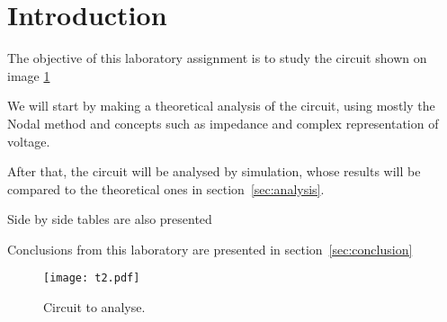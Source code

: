 \section{Introduction}

The objective of this laboratory assignment is to study the circuit shown on image \ref{Fig1: circuit}

We will start by making a theoretical analysis of the circuit, using mostly the Nodal method and concepts such as impedance and complex representation of voltage.

After that, the circuit will be analysed by simulation, whose results will be compared to the theoretical ones in section~\ref{sec:analysis}.

Side by side tables are also presented

Conclusions from this laboratory are presented in section~\ref{sec:conclusion}

\begin{figure}[h] 
\centering
\texttt{[image: t2.pdf]}
\caption{Circuit to analyse.}
\label{Fig1: circuit}
\end{figure}
